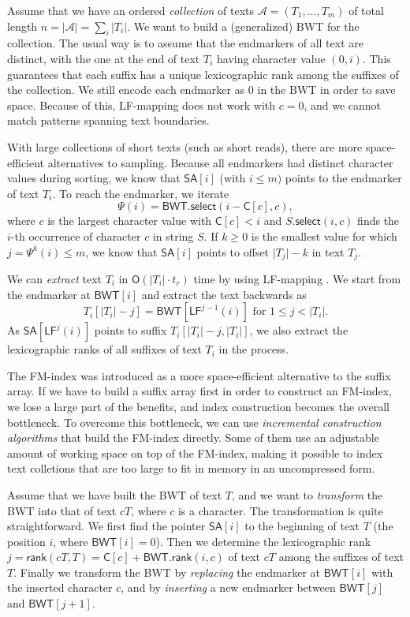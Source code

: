\documentclass[smallabstract,smallcaptions]{dccpaper}
\newcommand{\abs}[1]{\ensuremath{\lvert #1 \rvert}}
\newcommand{\Oh}{\ensuremath{\mathsf{O}}}
\newcommand{\BWT}{\textsf{BWT}}
\newcommand{\mSA}{\ensuremath{\mathsf{SA}}}
\newcommand{\mBWT}{\ensuremath{\mathsf{BWT}}}
\newcommand{\mC}{\ensuremath{\mathsf{C}}}
\newcommand{\LF}{\textsf{LF}}
\newcommand{\mrank}{\ensuremath{\mathsf{rank}}}
\newcommand{\mselect}{\ensuremath{\mathsf{select}}}
\newcommand{\Acoll}{\ensuremath{\mathcal{A}}}
\begin{document}
Assume that we have an ordered \emph{collection} of texts $\Acoll = (T_{1}, \dotsc, T_{m})$ of total length $n = \abs{\Acoll} = \sum_{i} \abs{T_{i}}$. We want to build a (generalized) \BWT{} for the collection. The usual way is to assume that the endmarkers of all text are distinct, with the one at the end of text $T_{i}$ having character value $(0,i)$. This guarantees that each suffix has a unique lexicographic rank among the suffixes of the collection. We still encode each endmarker as $0$ in the \BWT{} in order to save space. Because of this, \LF\nobreakdash-mapping does not work with $c = 0$, and we cannot match patterns spanning text boundaries.

With large collections of short texts (such as short reads), there are more space-efficient alternatives to sampling. Because all endmarkers had distinct character values during sorting, we know that $\mSA[i]$ (with $i \le m)$ points to the endmarker of text $T_{i}$. To reach the endmarker, we iterate
$$
\Psi(i) = \mBWT.\mselect(i - \mC[c], c),
$$
where $c$ is the largest character value with $\mC[c] < i$ and $S.\mselect(i,c)$ finds the $i$\nobreakdash-th occurrence of character $c$ in string $S$. If $k \ge 0$ is the smallest value for which $j = \Psi^{k}(i) \le m$, we know that $\mSA[i]$ points to offset $\abs{T_{j}} - k$ in text $T_{j}$.

We can \emph{extract} text $T_{i}$ in $\Oh(\abs{T_{i}} \cdot t_{r})$ time by using \LF\nobreakdash-mapping \cite{Burrows1994}. We start from the endmarker at $\mBWT[i]$ and extract the text backwards as
$$
T_{i}[\abs{T_{i}} - j] = \mBWT[\LF^{j-1}(i)] \,\, \textrm{for} \,\, 1 \le j < \abs{T_{i}}.
$$
As $\mSA[\LF^{j}(i)]$ points to suffix $T_{i}[\abs{T_{i}}-j, \abs{T_{i}}]$, we also extract the lexicographic ranks of all suffixes of text $T_{i}$ in the process.


\Section{Space-efficient \BWT{} construction}

The FM-index was introduced as a more space-efficient alternative to the suffix array. If we have to build a suffix array first in order to construct an FM-index, we lose a large part of the benefits, and index construction becomes the overall bottleneck. To overcome this bottleneck, we can use \emph{incremental construction algorithms} that build the FM-index directly. Some of them use an adjustable amount of working space on top of the FM-index, making it possible to index text colletions that are too large to fit in memory in an uncompressed form.

Assume that we have built the \BWT{} of text $T$, and we want to \emph{transform} the \BWT{} into that of text $cT$, where $c$ is a character. The transformation \cite{Hon2007} is quite straightforward. We first find the pointer $\mSA[i]$ to the beginning of text $T$ (the position $i$, where $\mBWT[i] = 0$). Then we determine the lexicographic rank $j = \mrank(cT, T) = \mC[c] + \mBWT.\mrank(i, c)$ of text $cT$ among the suffixes of text $T$. Finally we transform the \BWT{} by \emph{replacing} the endmarker at $\mBWT[i]$ with the inserted character $c$, and by \emph{inserting} a new endmarker between $\mBWT[j]$ and $\mBWT[j+1]$.
\end{document}
